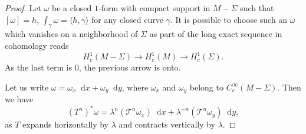 \documentclass[JEP,XML,SOM,Unicode]{cedram}
\newcommand{\boT}{\mathcal{T}}
\newcommand{\dd}{\mathop{}\!\mathrm{d}}
\theoremstyle{definition}
\numberwithin{equation}{section}
\begin{document}
\begin{proof}
Let $\omega$ be a closed $1$-form with compact support in $M-\Sigma$ such
that $[\omega] = h$, \ie $\int_\gamma \omega = \langle h, \gamma \rangle$
for any closed curve $\gamma$. It is possible to choose such an $\omega$
which vanishes on a neighborhood of $\Sigma$ as part of the long exact
sequence in cohomology reads
\[
H^1_c(M-\Sigma) \to H^1_c(M) \to
H^1_c(\Sigma).
\]
As the last term is $0$, the previous arrow is onto.

Let us write $\omega = \omega_x \dd x + \omega_y \dd y$, where $\omega_x$ and
$\omega_y$ belong to $C^\infty_c(M-\Sigma)$. Then we have
\begin{equation*}
(T^n)^* \omega = \lambda^n (\boT^n \omega_x) \dd x + \lambda^{-n} (\boT^n \omega_y) \dd y,
\end{equation*}
as $T$ expands horizontally by $\lambda$ and contracts vertically by
$\lambda$.


\end{proof}
\end{document}
